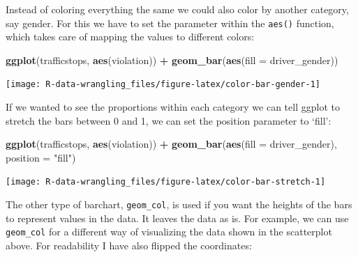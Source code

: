 \documentclass[]{book}
\newenvironment{Shaded}{\begin{snugshade}}{\end{snugshade}}
\newcommand{\DataTypeTok}[1]{\textcolor[rgb]{0.13,0.29,0.53}{#1}}
\newcommand{\FloatTok}[1]{\textcolor[rgb]{0.00,0.00,0.81}{#1}}
\newcommand{\KeywordTok}[1]{\textcolor[rgb]{0.13,0.29,0.53}{\textbf{#1}}}
\newcommand{\NormalTok}[1]{#1}
\newcommand{\OperatorTok}[1]{\textcolor[rgb]{0.81,0.36,0.00}{\textbf{#1}}}
\newcommand{\StringTok}[1]{\textcolor[rgb]{0.31,0.60,0.02}{#1}}
\begin{document}
Instead of coloring everything the same we could also color by another category, say gender. For this we have to set the parameter within the \texttt{aes()} function, which takes care of mapping the values to different colors:

\begin{Shaded}
\begin{Highlighting}[]
\KeywordTok{ggplot}\NormalTok{(trafficstops, }\KeywordTok{aes}\NormalTok{(violation)) }\OperatorTok{+}\StringTok{ }
\StringTok{  }\KeywordTok{geom_bar}\NormalTok{(}\KeywordTok{aes}\NormalTok{(}\DataTypeTok{fill =}\NormalTok{ driver_gender))}
\end{Highlighting}
\end{Shaded}

\texttt{[image: R-data-wrangling\_files/figure-latex/color-bar-gender-1]}

If we wanted to see the proportions within each category we can tell ggplot to stretch the bars between 0 and 1, we can set the position parameter to `fill':

\begin{Shaded}
\begin{Highlighting}[]
\KeywordTok{ggplot}\NormalTok{(trafficstops, }\KeywordTok{aes}\NormalTok{(violation)) }\OperatorTok{+}\StringTok{ }
\StringTok{  }\KeywordTok{geom_bar}\NormalTok{(}\KeywordTok{aes}\NormalTok{(}\DataTypeTok{fill =}\NormalTok{ driver_gender), }\DataTypeTok{position =} \StringTok{"fill"}\NormalTok{)}
\end{Highlighting}
\end{Shaded}

\texttt{[image: R-data-wrangling\_files/figure-latex/color-bar-stretch-1]}

The other type of barchart, \texttt{geom\_col}, is used if you want the heights of the bars to represent values in the data. It leaves the data as is.
For example, we can use \texttt{geom\_col} for a different way of visualizing the data shown in the scatterplot above. For readability I have also flipped the coordinates:

\begin{Shaded}
\end{Shaded}
\end{document}
